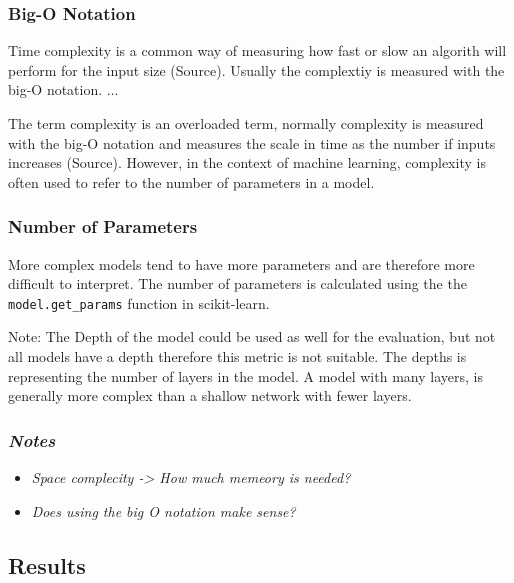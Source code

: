 \subsubsection*{Big-O Notation}

Time complexity is a common way of measuring how fast or slow an algorith will perform for the
input size (Source). Usually the complextiy is measured with the big-O notation.
...

The term complexity is an overloaded term, normally complexity is measured with the big-O
notation and measures the scale in time as the number if inputs increases (Source).
However, in the context of machine learning, complexity is often used to refer to the
number of parameters in a model.

\subsubsection*{Number of Parameters}
More complex models tend to have more parameters and are therefore more difficult to interpret.
The number of parameters is calculated using the the \texttt{model.get\_params} function
in scikit-learn.

Note: The Depth of the model could be used as well for the evaluation, but not all models have a
depth therefore this metric is not suitable.
The depths is representing the number of layers in the model.
A model with many layers, is generally more complex than a shallow network with fewer layers.

\subsubsection*{\textit{Notes}}

\begin{itemize}
    \item \textit{Space complecity -> How much memeory is needed?}
    \item \textit{Does using the big O notation make sense?}
\end{itemize}

\subsection{Results}\label{subsec:results2}

